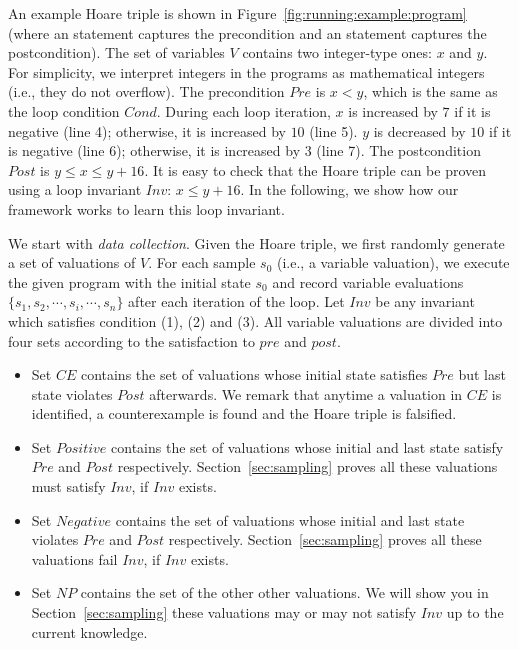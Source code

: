 \begin{example}
An example Hoare triple is shown in Figure~\ref{fig:running:example:program} (where an  statement captures the precondition and an  statement captures the postcondition). The set of variables $V$ contains two integer-type ones: $x$ and $y$. For simplicity, we interpret integers in the programs as mathematical integers (i.e., they do not overflow). The precondition $\mathit{Pre}$ is $x < y$, which is the same as the loop condition $\mathit{Cond}$.
During each loop iteration, $x$ is increased by $7$ if it is negative (line 4); otherwise, it is increased by $10$ (line 5). $y$ is decreased by $10$ if it is negative (line 6); otherwise, it is increased by $3$ (line 7). The postcondition $\mathit{Post}$ is $y \le x \le y + 16$. It is easy to check that the Hoare triple can be proven using a loop invariant $\mathit{Inv}$: $x \le y + 16$. In the following, we show how our framework works to learn this loop invariant.
\end{example}
We start with \emph{data collection}. Given the Hoare triple, we first randomly generate a set of valuations of $V$. 
For each sample $s_0$ (i.e., a variable valuation), we execute the given program with the initial state $s_0$ and record variable evaluations $\{s_1, s_2, \cdots, s_i, \cdots, s_n\}$ after each iteration of the loop. 
Let $\mathit{Inv}$ be any invariant which satisfies condition (1), (2) and (3). 
All variable valuations are divided into four sets according to the satisfaction to $pre$ and $post$.
\begin{itemize}
    \item Set $\mathit{CE}$ contains the set of valuations whose initial state satisfies $Pre$ but last state violates $Post$ afterwards. We remark that anytime a valuation in $\mathit{CE}$ is identified, a counterexample is found and the Hoare triple is falsified.
    \item Set $\mathit{Positive}$ contains the set of valuations whose initial and last state satisfy $Pre$ and $Post$ respectively. Section~\ref{sec:sampling} proves all these valuations must satisfy $\mathit{Inv}$, if $\mathit{Inv}$ exists.
    \item Set $\mathit{Negative}$ contains the set of valuations whose initial and last state violates $Pre$ and $Post$ respectively. Section~\ref{sec:sampling} proves all these valuations fail $\mathit{Inv}$, if $\mathit{Inv}$ exists.
    \item Set $\mathit{NP}$ contains the set of the other other valuations. We will show you in Section~\ref{sec:sampling} these valuations may or may not satisfy $\mathit{Inv}$ up to the current knowledge.
\end{itemize}

